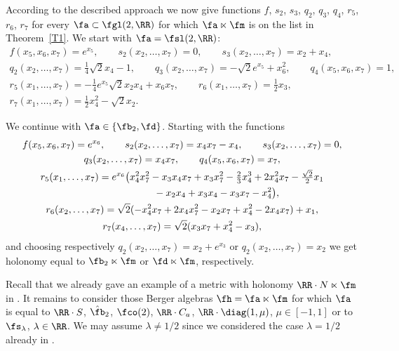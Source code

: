 According to the described approach we now give functions $f$, $s_2$, $s_3$, $q_2$, $q_3$, $q_4$, $r_5$, $r_6$, $r_7$ for every $\fa\subset\fgl(2,\RR)$ for which $\fa\ltimes \fm$ is on the list in Theorem~\ref{T1}. We start with $\fa=\fsl(2,\RR)$:
\begin{gather*}
f(x_5,x_6,x_7) = e^{x_5},\qquad
s_2(x_2,\dots,x_7) = 0,\qquad
s_3(x_2,\dots,x_7) = x_2+x_4,\\
q_2(x_2,\dots,x_7) = \tfrac14 \sqrt2 x_4-1,\qquad
q_3(x_2,\dots,x_7) = -\sqrt2 e^{x_5}+x_6^2,\qquad
q_4(x_5,x_6,x_7) = 1,\\
r_5(x_1,\dots,x_7) = -\tfrac14 e^{x_5} \sqrt2 x_2x_4+x_6x_7,\qquad
r_6(x_1,\dots,x_7) = \tfrac12 x_3, \\
r_7(x_1,\dots,x_7) = \tfrac12 x_4^2- \sqrt2 x_2 .
\end{gather*}

We continue with $\fa\in \{\fb_2, \fd\}$. Starting with the functions
\begin{gather*}
f(x_5,x_6,x_7) = e^{x_6} ,\qquad
s_2(x_2,\dots, x_7) = x_4 x_7-x_4,\qquad
 s_3 (x_2, \dots, x_7) = 0,\\
q_3(x_2, \dots, x_7) = x_4 x_7,\qquad
q_4 (x_5,x_6,x_7) = x_7,\\
r_5(x_1,\dots, x_7) = e^{x_6} \big( x_4^2 x_7^2 - x_3 x_4 x_7 + x_3 x_7^2 - \tfrac23 x_4^3 + 2 x_4^2 x_7 - \tfrac { \sqrt{2}}2 x_1 \\
\hphantom{r_5(x_1,\dots, x_7) =}{} - x_2 x_4 + x_3 x_4 - x_3 x_7 - x_4^2\big),\\
r_6(x_2,\dots, x_7) = \sqrt{2} (-x_4^2 x_7 + 2 x_4 x_7^2 - x_2 x_7 + x_4^2 - 2 x_4 x_7) + x_1 ,\\
r_7(x_4,\dots, x_7) = \sqrt 2 (x_3 x_7 + x_4^2 - x_3),
\end{gather*}
and choosing respectively $q_2 (x_2, \dots, x_7) = x_2 + e^{x_3}$ or $q_2 (x_2, \dots, x_7) = x_2 $ we get holonomy equal to $\fb_2\ltimes \fm $ or $\fd\ltimes \fm$, respectively.

Recall that we already gave an example of a metric with holonomy $\RR\cdot N\ltimes \fm$ in \cite{FK}. It remains to consider those Berger algebras $\fh=\fa\ltimes \fm$ for which $\fa$ is equal to $\RR\cdot S$, $\hat \fb_2$, $\fco(2)$, $\RR\cdot C_a$, $\RR\cdot\diag(1,\mu)$, $\mu\in[-1,1]$ or to $\fs_\lambda$, $\lambda\in\RR$. We may assume $\lambda\not=1/2$ since we considered the case $\lambda=1/2$ already in \cite{FK}.

